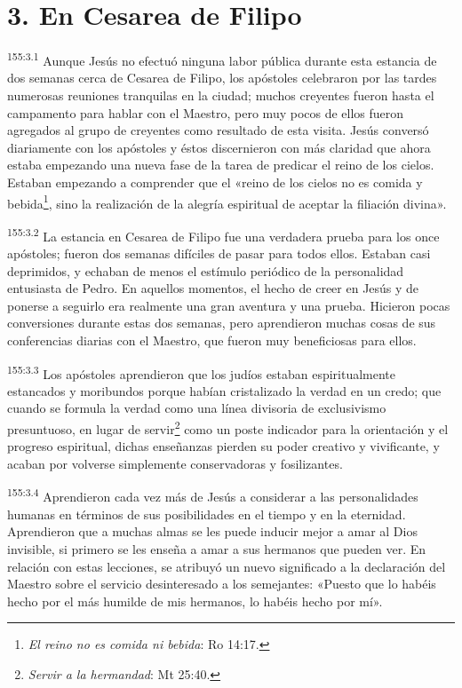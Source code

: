 \section*{3. En Cesarea de Filipo}
\par
\textsuperscript{155:3.1} Aunque Jesús no efectuó ninguna labor pública durante esta estancia de dos semanas cerca de Cesarea de Filipo, los apóstoles celebraron por las tardes numerosas reuniones tranquilas en la ciudad; muchos creyentes fueron hasta el campamento para hablar con el Maestro, pero muy pocos de ellos fueron agregados al grupo de creyentes como resultado de esta visita. Jesús conversó diariamente con los apóstoles y éstos discernieron con más claridad que ahora estaba empezando una nueva fase de la tarea de predicar el reino de los cielos. Estaban empezando a comprender que el «reino de los cielos no es comida y bebida\footnote{\textit{El reino no es comida ni bebida}: Ro 14:17.}, sino la realización de la alegría espiritual de aceptar la filiación divina».

\par
\textsuperscript{155:3.2} La estancia en Cesarea de Filipo fue una verdadera prueba para los once apóstoles; fueron dos semanas difíciles de pasar para todos ellos. Estaban casi deprimidos, y echaban de menos el estímulo periódico de la personalidad entusiasta de Pedro. En aquellos momentos, el hecho de creer en Jesús y de ponerse a seguirlo era realmente una gran aventura y una prueba. Hicieron pocas conversiones durante estas dos semanas, pero aprendieron muchas cosas de sus conferencias diarias con el Maestro, que fueron muy beneficiosas para ellos.

\par
\textsuperscript{155:3.3} Los apóstoles aprendieron que los judíos estaban espiritualmente estancados y moribundos porque habían cristalizado la verdad en un credo; que cuando se formula la verdad como una línea divisoria de exclusivismo presuntuoso, en lugar de servir\footnote{\textit{Servir a la hermandad}: Mt 25:40.} como un poste indicador para la orientación y el progreso espiritual, dichas enseñanzas pierden su poder creativo y vivificante, y acaban por volverse simplemente conservadoras y fosilizantes.

\par
\textsuperscript{155:3.4} Aprendieron cada vez más de Jesús a considerar a las personalidades humanas en términos de sus posibilidades en el tiempo y en la eternidad. Aprendieron que a muchas almas se les puede inducir mejor a amar al Dios invisible, si primero se les enseña a amar a sus hermanos que pueden ver. En relación con estas lecciones, se atribuyó un nuevo significado a la declaración del Maestro sobre el servicio desinteresado a los semejantes: «Puesto que lo habéis hecho por el más humilde de mis hermanos, lo habéis hecho por mí».


